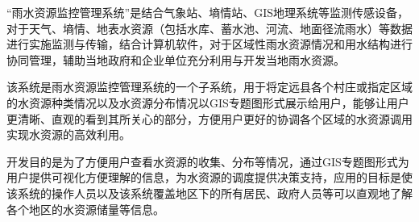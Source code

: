 “雨水资源监控管理系统”是结合气象站、墒情站、GIS地理系统等监测传感设备，对于天气、墒情、地表水资源（包括水库、蓄水池、河流、地面径流雨水）等数据进行实施监测与传输，结合计算机软件，对于区域性雨水资源情况和用水结构进行协同管理，辅助当地政府和企业单位充分利用与开发当地雨水资源。

该系统是雨水资源监控管理系统的一个子系统，用于将定远县各个村庄或指定区域的水资源种类情况以及水资源分布情况以GIS专题图形式展示给用户，能够让用户更清晰、直观的看到其所关心的部分，方便用户更好的协调各个区域的水资源调用实现水资源的高效利用。

开发目的是为了方便用户查看水资源的收集、分布等情况，通过GIS专题图形式为用户提供可视化方便理解的信息，为水资源的调度提供决策支持，应用的目标是使该系统的操作人员以及该系统覆盖地区下的所有居民、政府人员等可以直观地了解各个地区的水资源储量等信息。
